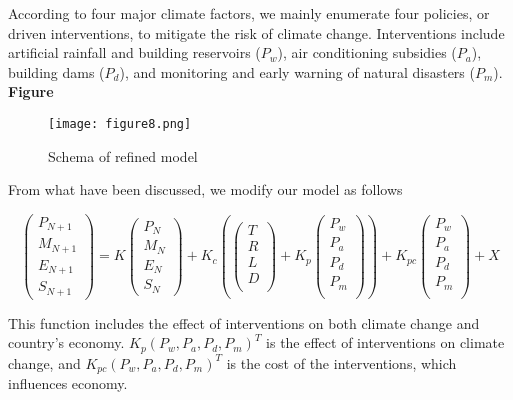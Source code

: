 \documentclass{mcmthesis}
\begin{document}
	According to four major climate factors, we mainly enumerate four policies, or driven interventions, to mitigate the risk of climate change. Interventions include artificial rainfall and building reservoirs ($P_w$), air conditioning subsidies ($P_a$), building dams ($P_d$), and monitoring and early warning of natural disasters ($P_m$). \textbf{Figure }
	
	\begin{figure}[h]
		\small
		\centering
		\texttt{[image: figure8.png]}
		\caption{Schema of refined model} \label{fig:Schema of refined model}
	\end{figure}
	
	From what have been discussed, we modify our model as follows
	  	\begin{spacing}{1.5}
	  	$$
	  	\left(
	  	\begin{matrix}
	  	P_{N+1} \\ M_{N+1} \\ E_{N+1} \\ S_{N+1}
	  	\end{matrix}
	  	\right) 
	  	= 
	  	K 
	  	\left(
	  	\begin{matrix}
	  	P_N \\ M_N \\ E_N \\ S_N
	  	\end{matrix}
	  	\right) 
	  	+
	  	K_c
	  	\left(
	  	\left(
	  	\begin{matrix}
	  	T \\ R \\ L \\ D \\
	  	\end{matrix}
	  	\right)
	  	+ 
	  	K_p
	  	\left(
	  	\begin{matrix}
	  	P_w \\ P_a \\ P_d \\ P_m \\
	  	\end{matrix}
	  	\right)
	  	\right)
	  	+
	  	K_{pc}
	  	\left(
	  	\begin{matrix}
	  	P_w \\ P_a \\ P_d \\ P_m \\
	  	\end{matrix}
	  	\right)
	  	+ X
	  	$$
	  \end{spacing}
	This function includes the effect of interventions on both climate change and country's economy. $K_p (P_w, P_a, P_d, P_m)^T$ is the effect of interventions on climate change, and $K_{pc} (P_w, P_a, P_d, P_m)^T$ is the cost of the interventions, which influences economy.
	
\end{document}
